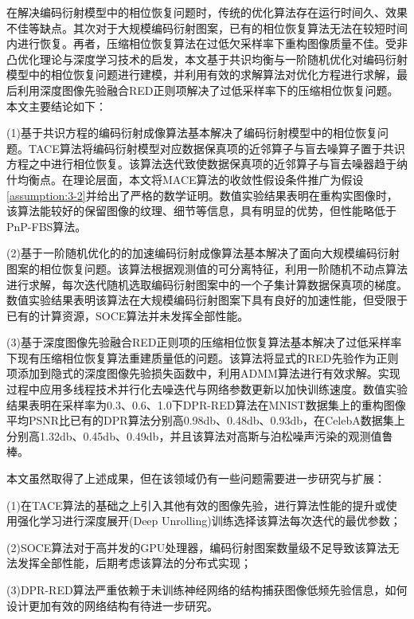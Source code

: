 \begin{conclusion}
\label{chap:conclusion}
在解决编码衍射模型中的相位恢复问题时，传统的优化算法存在运行时间久、效果不佳等缺点。其次对于大规模编码衍射图案，已有的相位恢复算法无法在较短时间内进行恢复。再者，压缩相位恢复算法在过低欠采样率下重构图像质量不佳。受非凸优化理论与深度学习技术的启发，本文基于共识均衡与一阶随机优化对编码衍射模型中的相位恢复问题进行建模，并利用有效的求解算法对优化方程进行求解，最后利用深度图像先验融合RED正则项解决了过低采样率下的压缩相位恢复问题。本文主要结论如下：

(1)基于共识方程的编码衍射成像算法基本解决了编码衍射模型中的相位恢复问题。TACE算法将编码衍射模型对应数据保真项的近邻算子与盲去噪算子置于共识方程之中进行相位恢复。该算法迭代致使数据保真项的近邻算子与盲去噪器趋于纳什均衡点。在理论层面，本文将MACE算法的收敛性假设条件推广为假设\ref{assumption:3-2}并给出了严格的数学证明。数值实验结果表明在重构实图像时，该算法能较好的保留图像的纹理、细节等信息，具有明显的优势，但性能略低于PnP-FBS算法。

(2)基于一阶随机优化的的加速编码衍射成像算法基本解决了面向大规模编码衍射图案的相位恢复问题。该算法根据观测值的可分离特征，利用一阶随机不动点算法进行求解，每次迭代随机选取编码衍射图案中的一个子集计算数据保真项的梯度。数值实验结果表明该算法在大规模编码衍射图案下具有良好的加速性能，但受限于已有的计算资源，SOCE算法并未发挥全部性能。

(3)基于深度图像先验融合RED正则项的压缩相位恢复算法基本解决了过低采样率下现有压缩相位恢复算法重建质量低的问题。该算法将显式的RED先验作为正则项添加到隐式的深度图像先验损失函数中，利用ADMM算法进行有效求解。实现过程中应用多线程技术并行化去噪迭代与网络参数更新以加快训练速度。数值实验结果表明在采样率为0.3、0.6、1.0下DPR-RED算法在MNIST数据集上的重构图像平均PSNR比已有的DPR算法分别高0.98db、0.48db、0.93db，在CelebA数据集上分别高1.32db、0.45db、0.49db，并且该算法对高斯与泊松噪声污染的观测值鲁棒。

本文虽然取得了上述成果，但在该领域仍有一些问题需要进一步研究与扩展：

(1)在TACE算法的基础之上引入其他有效的图像先验，进行算法性能的提升或使用强化学习进行深度展开(Deep Unrolling)训练选择该算法每次迭代的最优参数；

(2)SOCE算法对于高并发的GPU处理器，编码衍射图案数量级不足导致该算法无法发挥全部性能，后期考虑该算法的分布式实现；
 
(3)DPR-RED算法严重依赖于未训练神经网络的结构捕获图像低频先验信息，如何设计更加有效的网络结构有待进一步研究。
\end{conclusion} 